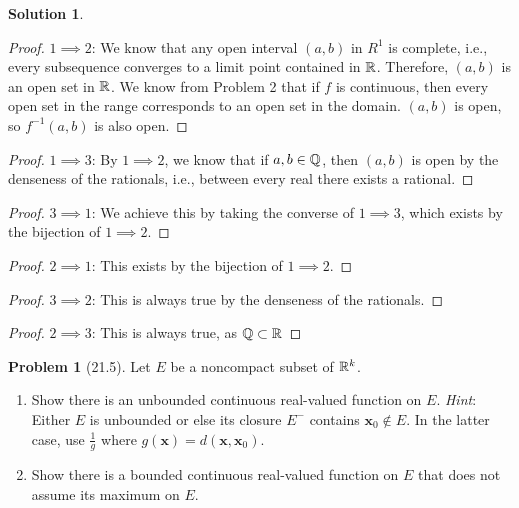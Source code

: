 \documentclass[12pt]{article}
\theoremstyle{definition} %
\newtheorem{solution}{Solution}
\newtheorem{problem}{Problem}
\theoremstyle{plain} %
\begin{document}
\begin{solution}
  \begin{proof}  
    $1\implies 2$: We know that any open interval $(a,b)$ in $R^{1}$ is complete, i.e., every subsequence converges to a limit point contained in $\mathbb{\MakeUppercase{r}}$. Therefore, $(a,b)$ is an open set in $\mathbb{\MakeUppercase{r}}$. We know from Problem 2 that if $f$ is continuous, then every open set in the range corresponds to an open set in the domain. $(a,b)$ is open, so $f^{-1}(a,b)$ is also open.    
    \end{proof}
\begin{proof}  
$1\implies 3$: By $1\implies 2$, we know that if $a,b\in \mathbb{\MakeUppercase{q}} $, then $(a,b)$ is open by the denseness of the rationals, i.e., between every real there exists a rational.  
\end{proof}
\begin{proof}  
$3\implies 1$: We achieve this by taking the converse of $1\implies 3$, which exists by the bijection of $1\implies 2$.
\end{proof}

\begin{proof}  
$2\implies 1$: This exists by the bijection of $1\implies 2$.  
\end{proof}
\begin{proof}  
$3\implies 2$: This is always true by the denseness of the rationals.
\end{proof}
\begin{proof}  
$2\implies 3$: This is always true, as $\mathbb{\MakeUppercase{q}} \subset \mathbb{\MakeUppercase{r}}$ 
\end{proof}
\end{solution}
\begin{problem}[21.5]
  Let $E$ be a noncompact subset of $\mathbb{\MakeUppercase{r}}^{k}$.
  \begin{enumerate}
    \item Show there is an unbounded continuous real-valued function on $E$. \emph{Hint}: Either $E$ is unbounded or else its closure $E^{-}$ contains $\mathbf{x}_{0} \notin E$. In the latter case, use $\frac{1}{g}$ where $g(\mathbf{x}) =d(\mathbf{x},\mathbf{x}_{0})$.
    \item Show there is a bounded continuous real-valued function on $E$ that does not assume its maximum on $E$.
  \end{enumerate}
\end{problem}
\end{document}
